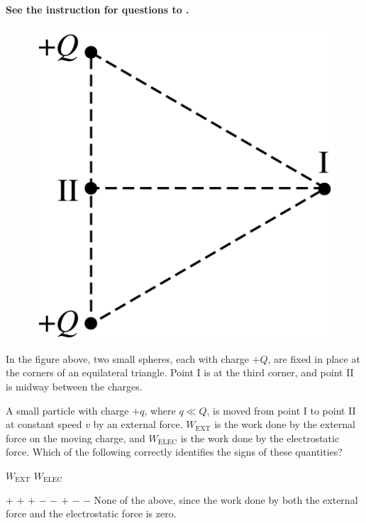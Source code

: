 \textbf{See the instruction for questions  to .}

\begin{figure}[H]
    \centering
    \includegraphics[scale=0.3]{images/img-002-000.png}
\end{figure}

In the figure above, two small spheres, each with charge $+Q$, are fixed in place at the corners of an equilateral triangle. Point $\mathrm{I}$ is at the third corner, and point II is midway between the charges.

\begin{questions}\setcounter{question}{0}\question
A small particle with charge $+q$, where $q \ll Q$, is moved from point I to point II at constant speed $v$ by an external force. $W_\mathrm{EXT}$ is the work done by the external force on the moving charge, and $W_\mathrm{ELEC}$ is the work done by the electrostatic force. Which of the following correctly identifies the signs of these quantities?

\tabto{0.75cm}\underline{$W_\mathrm{EXT}$}
\tabto{3.00cm}\underline{$W_\mathrm{ELEC}$}

\begin{choices}
\choice $+$ \tabto{2.25cm} $+$
\choice $+$ \tabto{2.25cm} $-$
\choice $-$ \tabto{2.25cm} $+$
\choice $-$ \tabto{2.25cm} $-$
\choice None of the above, since the work done by both the external force and the electrostatic force is zero.
\end{choices}\end{questions}

